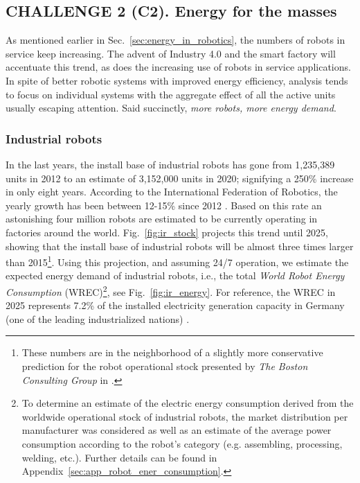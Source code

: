 \subsection{\textbf{CHALLENGE 2} (C2). Energy for the masses}\label{sec:robots_challenge}
As mentioned earlier in Sec.~\ref{sec:energy_in_robotics}, the numbers of robots in service keep increasing. The advent of Industry 4.0 and the smart factory will accentuate this trend, as does the increasing use of robots in service applications. In spite of better robotic systems with improved energy efficiency, analysis tends to focus on individual systems with the aggregate effect of all the active units usually escaping attention. Said succinctly, \emph{more robots, more energy demand}. %

\subsubsection{Industrial robots}
In the last years, the install base of industrial robots has gone from 1,235,389 units in 2012 to an estimate of 3,152,000 units in 2020; signifying a 250\% increase in only eight years. According to the International Federation of Robotics, the yearly growth has been between 12-15\% since 2012 \cite{IFR2019}. Based on this rate an astonishing four million robots are estimated to be currently operating in factories around the world. Fig.~\ref{fig:ir_stock} projects this trend until 2025, showing that the install base of industrial robots will be almost three times larger than 2015\footnote{These numbers are in the neighborhood of a slightly more conservative prediction for the robot operational stock presented by \textit{The Boston Consulting Group} in \cite{sirkin2015}.}. Using this projection, and assuming 24/7 operation, we estimate the expected energy demand of industrial robots, i.e., the total \textit{World Robot Energy Consumption} (WREC)\footnote{To determine an estimate of the electric energy consumption derived from the worldwide operational stock of industrial robots, the market distribution per manufacturer was considered as well as an estimate of the average power consumption according to the robot's category (e.g. assembling, processing, welding, etc.). Further details can be found in Appendix~\ref{sec:app_robot_ener_consumption}.}, see Fig.~\ref{fig:ir_energy}. For reference, the WREC in 2025 represents 7.2\% of the installed electricity generation capacity in Germany (one of the leading industrialized nations) \cite{fraunhofer2016}. 

